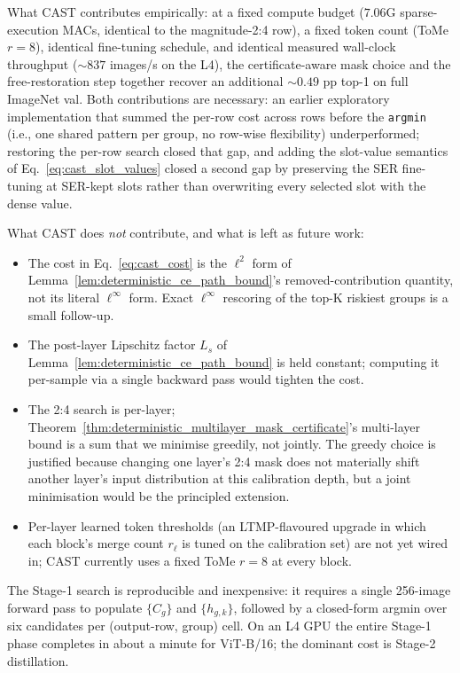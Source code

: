 \documentclass[11pt]{article}
\theoremstyle{plain}
\theoremstyle{definition}
\theoremstyle{remark}
\newcommand{\1}{\mathbf{1}}
\begin{document}
What CAST contributes empirically: at a fixed compute budget (\(7.06\)G sparse-execution MACs, identical to the magnitude-2:4 row), a fixed token count (ToMe \(r=8\)), identical fine-tuning schedule, and identical measured wall-clock throughput (\(\sim\!837\) images/s on the L4), the certificate-aware mask choice and the free-restoration step together recover an additional \(\sim\!0.49\) pp top-1 on full ImageNet val.  Both contributions are necessary: an earlier exploratory implementation that summed the per-row cost across rows before the \texttt{argmin} (i.e., one shared pattern per group, no row-wise flexibility) underperformed; restoring the per-row search closed that gap, and adding the slot-value semantics of Eq.~\eqref{eq:cast_slot_values} closed a second gap by preserving the SER fine-tuning at SER-kept slots rather than overwriting every selected slot with the dense value.

What CAST does \emph{not} contribute, and what is left as future work:
\begin{itemize}
\item The cost in Eq.~\eqref{eq:cast_cost} is the \(\ell^2\) form of Lemma~\ref{lem:deterministic_ce_path_bound}'s removed-contribution quantity, not its literal \(\ell^\infty\) form.  Exact \(\ell^\infty\) rescoring of the top-K riskiest groups is a small follow-up.
\item The post-layer Lipschitz factor \(L_s\) of Lemma~\ref{lem:deterministic_ce_path_bound} is held constant; computing it per-sample via a single backward pass would tighten the cost.
\item The 2:4 search is per-layer; Theorem~\ref{thm:deterministic_multilayer_mask_certificate}'s multi-layer bound is a sum that we minimise greedily, not jointly.  The greedy choice is justified because changing one layer's 2:4 mask does not materially shift another layer's input distribution at this calibration depth, but a joint minimisation would be the principled extension.
\item Per-layer learned token thresholds (an LTMP-flavoured upgrade in which each block's merge count \(r_\ell\) is tuned on the calibration set) are not yet wired in; CAST currently uses a fixed ToMe \(r=8\) at every block.
\end{itemize}

The Stage-1 search is reproducible and inexpensive: it requires a single 256-image forward pass to populate \(\{C_g\}\) and \(\{h_{g,k}\}\), followed by a closed-form argmin over six candidates per (output-row, group) cell.  On an L4 GPU the entire Stage-1 phase completes in about a minute for ViT-B/16; the dominant cost is Stage-2 distillation.
\end{document}
